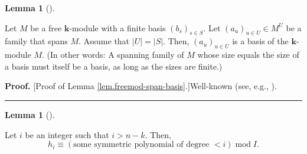 \documentclass[numbers=enddot,12pt,final,onecolumn,notitlepage]{scrartcl}%
\theoremstyle{definition}
\newtheorem{lem}[theo]{Lemma}
\newenvironment{lemma}[1][]
{\begin{lem}[#1]\begin{leftbar}}
{\end{leftbar}\end{lem}}
\newenvironment{proof}[1][Proof]{\noindent\textbf{#1.} }{\ \rule{0.5em}{0.5em}}
\begin{document}
\begin{lemma}
\label{lem.freemod-span-basis}Let $M$ be a free $\mathbf{k}$-module with a
finite basis $\left(  b_{s}\right)  _{s\in S}$. Let $\left(  a_{u}\right)
_{u\in U}\in M^{U}$ be a family that spans $M$. Assume that $\left\vert
U\right\vert =\left\vert S\right\vert $. Then, $\left(  a_{u}\right)  _{u\in
U}$ is a basis of the $\mathbf{k}$-module $M$. (In other words: A spanning
family of $M$ whose size equals the size of a basis must itself be a basis, as
long as the sizes are finite.)
\end{lemma}

\begin{proof}
[Proof of Lemma \ref{lem.freemod-span-basis}.]Well-known (see, e.g.,
\cite[Exercise 2.5.18 \textbf{(b)}]{GriRei18}).
\end{proof}

\begin{lemma}
\label{lem.I.hi-red}Let $i$ be an integer such that $i>n-k$. Then,%
\[
h_{i}\equiv\left(  \text{some symmetric polynomial of degree }<i\right)
\operatorname{mod}I.
\]

\end{lemma}
\end{document}
